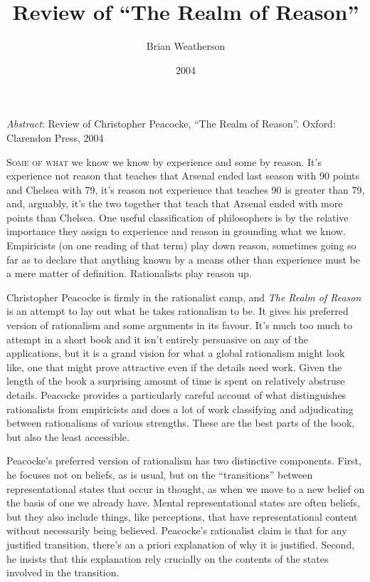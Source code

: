 \documentclass[
  11pt,
  letterpaper,
  DIV=11,
  numbers=noendperiod,
  twoside]{scrartcl}
\title{Review of ``The Realm of Reason''}
\author{Brian Weatherson}
\date{2004}
\renewenvironment{abstract}
 {\vspace{-1.25cm}
 \quotation\small\noindent\emph{Abstract}:}
 {\endquotation}
\renewenvironment{abstract}
 {\quotation\small\noindent\emph{Abstract}:}
 {\endquotation\vspace{-0.02cm}}
\begin{document}
\maketitle
\begin{abstract}
Review of Christopher Peacocke, ``The Realm of Reason''. Oxford:
Clarendon Press, 2004
\end{abstract}


\lettrine{S}{ome of what} we know we know by experience and some by
reason. It's experience not reason that teaches that Arsenal ended last
season with 90 points and Chelsea with 79, it's reason not experience
that teaches 90 is greater than 79, and, arguably, it's the two together
that teach that Arsenal ended with more points than Chelsea. One useful
classification of philosophers is by the relative importance they assign
to experience and reason in grounding what we know. Empiricists (on one
reading of that term) play down reason, sometimes going so far as to
declare that anything known by a means other than experience must be a
mere matter of definition. Rationalists play reason up.

Christopher Peacocke is firmly in the rationalist camp, and \emph{The
Realm of Reason} is an attempt to lay out what he takes rationalism to
be. It gives his preferred version of rationalism and some arguments in
its favour. It's much too much to attempt in a short book and it isn't
entirely persuasive on any of the applications, but it is a grand vision
for what a global rationalism might look like, one that might prove
attractive even if the details need work. Given the length of the book a
surprising amount of time is spent on relatively abstruse details.
Peacocke provides a particularly careful account of what distinguishes
rationalists from empiricists and does a lot of work classifying and
adjudicating between rationalisms of various strengths. These are the
best parts of the book, but also the least accessible.

Peacocke's preferred version of rationalism has two distinctive
components. First, he focuses not on beliefs, as is usual, but on the
``transitions'' between representational states that occur in thought,
as when we move to a new belief on the basis of one we already have.
Mental representational states are often beliefs, but they also include
things, like perceptions, that have representational content without
necessarily being believed. Peacocke's rationalist claim is that for any
justified transition, there's an a priori explanation of why it is
justified. Second, he insists that this explanation rely crucially on
the contents of the states involved in the transition.
\end{document}
